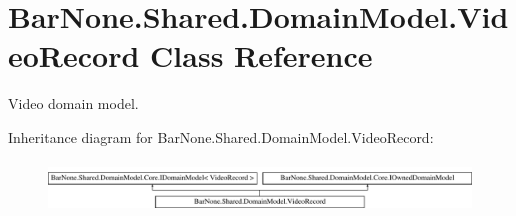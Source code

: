 \hypertarget{class_bar_none_1_1_shared_1_1_domain_model_1_1_video_record}{}\section{Bar\+None.\+Shared.\+Domain\+Model.\+Video\+Record Class Reference}
\label{class_bar_none_1_1_shared_1_1_domain_model_1_1_video_record}


Video domain model.  


Inheritance diagram for Bar\+None.\+Shared.\+Domain\+Model.\+Video\+Record\+:\begin{figure}[H]
\begin{center}
\leavevmode
\includegraphics[height=1.365854cm]{class_bar_none_1_1_shared_1_1_domain_model_1_1_video_record}
\end{center}
\end{figure}
